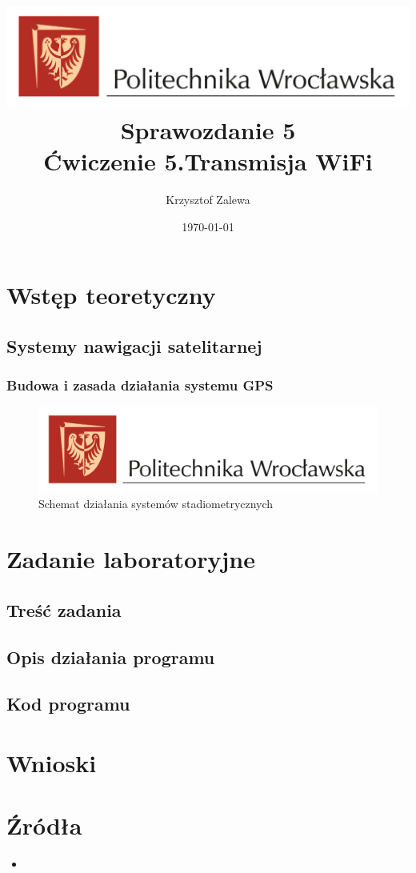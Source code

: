 \documentclass{article}
\title{
  \centering
  \includegraphics[width=\textwidth]{src/images/logo_PWr_kolor_poziom.png}\\
  \fontsize{28pt}{30pt}\selectfont Sprawozdanie 5\\
  \fontsize{14pt}{30pt}\selectfont Ćwiczenie 5.Transmisja WiFi}
\author{Krzysztof Zalewa}
\date{\daymonthyear\today}
\begin{document}
  \maketitle
  \pagebreak
  \tableofcontents
  \pagebreak
  \section{Wstęp teoretyczny}
    \subsection{Systemy nawigacji satelitarnej}
    \subsubsection{Budowa i zasada działania systemu GPS}
    \begin{figure}[ht]
      \centering
      \includegraphics[width=\textwidth]{src/images/logo_PWr_kolor_poziom.png}
      \caption{Schemat działania systemów stadiometrycznych}
      \label{fig:gps}
    \end{figure}
    
  \raggedright
  \section{Zadanie laboratoryjne}
    \subsection{Treść zadania}
    
    \subsection{Opis działania programu}
    
    \subsection{Kod programu}
  \section{Wnioski}

  \section{Źródła}
  \begin{itemize}
    \item 
  \end{itemize}
\end{document}
